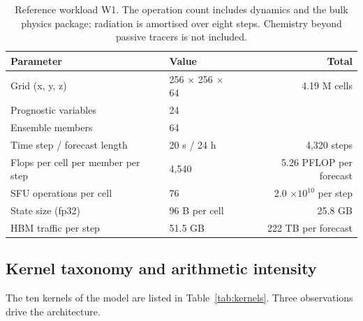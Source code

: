 \begin{table}[t]
\centering\small
\caption{Reference workload W1. The operation count includes dynamics and the bulk physics package;
radiation is amortised over eight steps. Chemistry beyond passive tracers is not included.}
\label{tab:bench}
\begin{tabular}{@{}llr@{}}
\toprule
Parameter & Value & Total\\
\midrule
Grid (x, y, z) & 256 $\times$ 256 $\times$ 64 & 4.19 M cells\\
Prognostic variables & 24 & \\
Ensemble members & 64 & \\
Time step / forecast length & 20 s / 24 h & 4,320 steps\\
Flops per cell per member per step & 4,540 & 5.26 PFLOP per forecast\\
SFU operations per cell & 76 & 2.0 $\times 10^{10}$ per step\\
State size (fp32) & 96 B per cell & 25.8 GB\\
HBM traffic per step & 51.5 GB & 222 TB per forecast\\
\bottomrule
\end{tabular}
\end{table}

\subsection{Kernel taxonomy and arithmetic intensity}
The ten kernels of the model are listed in Table~\ref{tab:kernels}. Three observations drive the
architecture.

